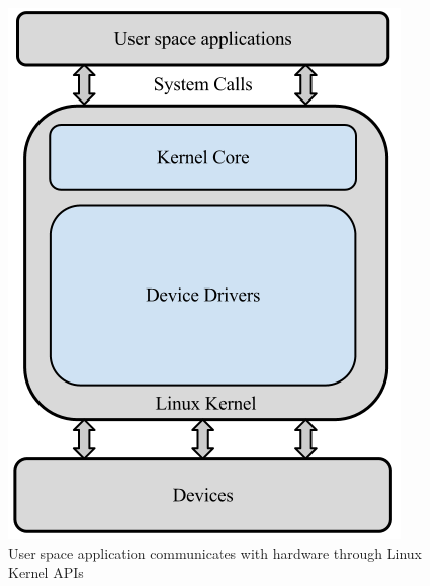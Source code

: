\documentclass[
12pt,
oneside, 
onehalfspacing, 
nolistspacing, 
parskip, 
chapterinoneline, 
]{AASTCOMPUTER}
\begin{document}
  
\begin{figure}[h]
\centering
\includegraphics[scale=0.4]{Figures/LinuxKernel.png}
\caption[Kernel Layer]{User space application communicates with hardware through Linux Kernel APIs}
\label{fig:Kernel Layer}
\end{figure}
\clearpage
\end{document}
